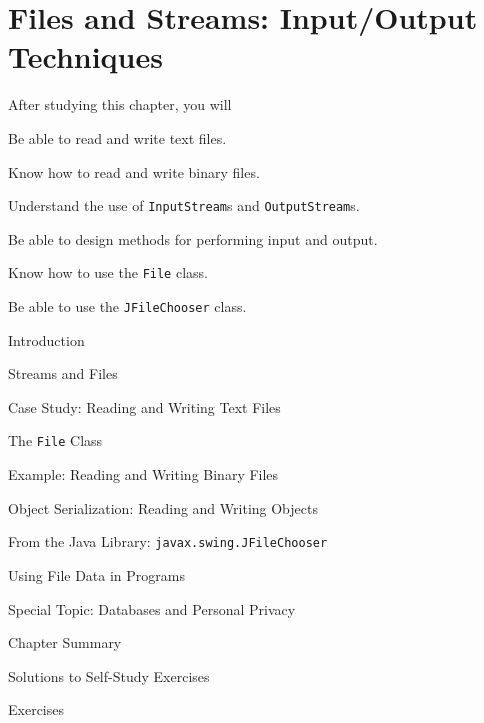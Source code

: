 \setcounter{SSTUDYcount}{1}
\setcounter{chapter}{10}
\chapter{Files and Streams: Input/Output Techniques}
\label{chapter-files}


\CObegin

\label{objectives}

\noindent After studying this chapter, you will

\begin{COBL}
\item  Be able to read and write text files.
\item  Know how to read and write binary files.
\item  Understand the  use of {\tt InputStream}s and {\tt OutputStream}s.
\item  Be able to design methods for performing
 input and output.
\item  Know how to use the {\tt File} class.
\item  Be able to use the {\tt JFileChooser} class.
\end{COBL}

\label{outline}

\begin{COL}
\item {Introduction}
\item {Streams and Files}
\item {Case Study: Reading and Writing Text Files}
\item {The {\tt File} Class}
\item {Example: Reading and Writing Binary Files}
\item {Object Serialization: Reading and Writing Objects}
\item {From the Java Library: {\tt javax.swing.JFileChooser}}
\item {Using File Data in Programs}    %
\item[] {\color{cyan}Special Topic: Databases and Personal Privacy}
\par\small\item[] {Chapter Summary}
\par\small\item[] {Solutions to Self-Study Exercises}
\par\small\item[] {Exercises}
\end{COL}
\COend

